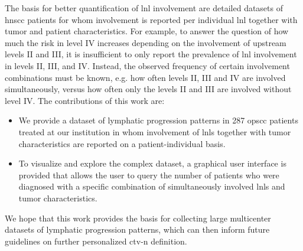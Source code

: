 \documentclass[\relativeRoot/main.tex]{subfiles}
\begin{document}
The basis for better quantification of \gls{lnl} involvement are detailed datasets of \gls{hnscc} patients for whom involvement is reported per individual \gls{lnl} together with tumor and patient characteristics. For example, to answer the question of how much the risk in level IV increases depending on the involvement of upstream levels II and III, it is insufficient to only report the prevalence of \gls{lnl} involvement in levels II, III, and IV. Instead, the observed frequency of certain involvement combinations must be known, e.g. how often levels II, III and IV are involved simultaneously, versus how often only the levels II and III are involved without level IV. The contributions of this work are:

\begin{itemize}
    \item We provide a dataset of lymphatic progression patterns in 287 \gls{opscc} patients treated at our institution in whom involvement of \glspl{lnl} together with tumor characteristics are reported on a patient-individual basis.
    \item To visualize and explore the complex dataset, a graphical user interface is provided that allows the user to query the number of patients who were diagnosed with a specific combination of simultaneously involved \glspl{lnl} and tumor characteristics.
\end{itemize}

We hope that this work provides the basis for collecting large multicenter datasets of lymphatic progression patterns, which can then inform future guidelines on further personalized \gls{ctv-n} definition.
\end{document}
